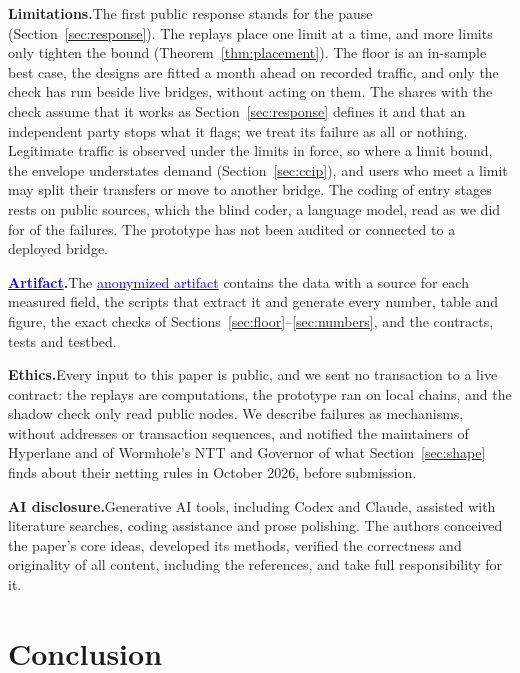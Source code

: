 \documentclass[conference,compsoc]{IEEEtran}
\newcommand{\artifactlink}[1]{\texorpdfstring{\href{https://github.com/submissionrepo/buying-time-artifact}{\textcolor{blue}{#1}}}{#1}}
\numberwithin{equation}{section}
\theoremstyle{plain}
\theoremstyle{definition}
\theoremstyle{remark}
\newcommand{\runin}[1]{\par\smallskip\noindent\textbf{#1.}\enspace}
\begin{document}
\runin{Limitations}The first public response stands for the pause (Section~\ref{sec:response}). The replays place one limit at a time, and more limits only tighten the bound (Theorem~\ref{thm:placement}). The floor is an in-sample best case, the designs are fitted a month ahead on recorded traffic, and only the check has run beside live bridges, without acting on them. The shares with the check assume that it works as Section~\ref{sec:response} defines it and that an independent party stops what it flags; we treat its failure as all or nothing. Legitimate traffic is observed under the limits in force, so where a limit bound, the envelope understates demand (Section~\ref{sec:ccip}), and users who meet a limit may split their transfers or move to another bridge. The coding of entry stages rests on public sources, which the blind coder, a language model, read as we did for \blindAgree{} of the \nEvents{} failures. The prototype has not been audited or connected to a deployed bridge.

\runin{\artifactlink{Artifact}}The \artifactlink{anonymized artifact} contains the data with a source for each measured field, the scripts that extract it and generate every number, table and figure, the exact checks of Sections~\ref{sec:floor}--\ref{sec:numbers}, and the contracts, tests and testbed.

\runin{Ethics}Every input to this paper is public, and we sent no transaction to a live contract: the replays are computations, the prototype ran on local chains, and the shadow check only read public nodes. We describe failures as mechanisms, without addresses or transaction sequences, and notified the maintainers of Hyperlane and of Wormhole's NTT and Governor of what Section~\ref{sec:shape} finds about their netting rules in October 2026, before submission.

\runin{AI disclosure}Generative AI tools, including Codex and Claude, assisted with literature searches, coding assistance and prose polishing. The authors conceived the paper's core ideas, developed its methods, verified the correctness and originality of all content, including the references, and take full responsibility for it.

\section{Conclusion}\label{sec:conclusion}
\end{document}
